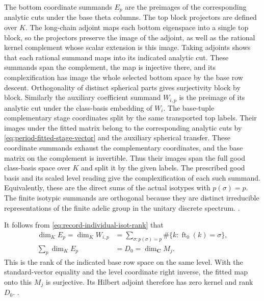 The bottom coordinate summands \(E_p\) are the preimages of
the corresponding analytic cuts under the base theta columns.
The top block projectors are defined over \(K\). The long-chain
adjoint maps each bottom eigenspace into a single top block, so
the projectors preserve the image of the adjoint, as well as the
rational kernel complement whose scalar extension is this image.
Taking adjoints shows that each rational summand maps into its
indicated analytic cut. These summands span the complement,
the map is injective there, and its complexification has image
the whole selected bottom space by the base row descent.
Orthogonality of distinct spherical parts gives surjectivity
block by block. Similarly the auxiliary coefficient summand
\(W_{i,p}\) is the preimage of its analytic cut under the
class-basis embedding of \(W_i\). The base-tuple complementary
stage coordinates split by the same transported top labels.
Their images under the fitted matrix belong to the corresponding
analytic cuts by \eqref{eq:period-fitted-stage-vector} and the
auxiliary spherical transfer. These coordinate summands exhaust
the complementary coordinates, and the base matrix on the
complement is invertible. Thus their images span the full good
class-basis space over \(K\) and split it by the given labels.
The prescribed good basis and its scaled level reading give the
complexification of each such summand. Equivalently, these are the
direct sums of the actual isotypes with \(p(\sigma)=p\). The
finite isotypic summands are orthogonal because they are distinct
irreducible representations of the finite adelic group in the
unitary discrete spectrum.
.

It follows from \eqref{eq:record-individual-isot-rank} that
\begin{equation}
 \label{eq:record-base-rank-sum}
 \begin{aligned}
 \dim_K E_p=\dim_K W_{i,p}
   &=\sum_{\sigma:p(\sigma)=p}\#\{k:\operatorname{ft}_0(k)=\sigma\},\\
 \sum_p\dim_K E_p&=D_0=\dim_{\mathbf C} M_j .
 \end{aligned}
\end{equation}
This is the rank of the indicated base row space on the same
level. With the standard-vector equality and the level coordinate
right inverse, the fitted map onto this \(M_j\) is surjective.
Its Hilbert adjoint therefore has zero kernel and rank \(D_0\).
.

